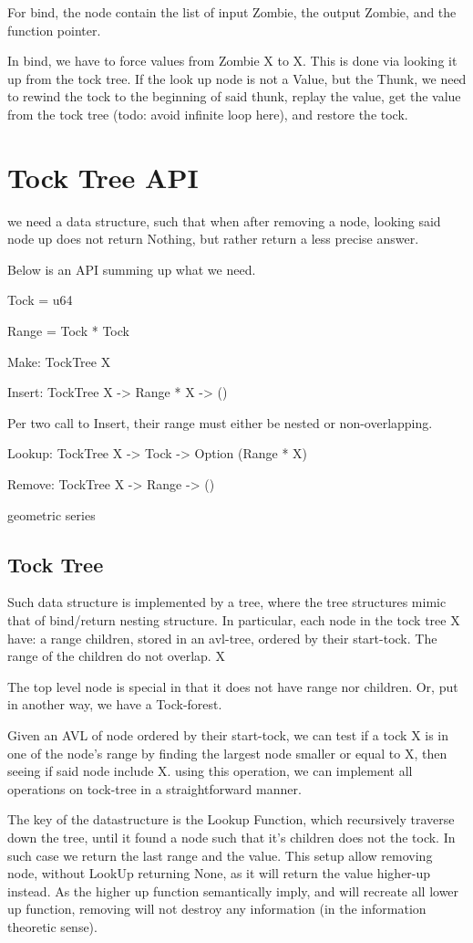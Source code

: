 For bind, the node contain the list of input Zombie, the output Zombie, and the function pointer.

In bind, we have to force values from Zombie X to X. This is done via looking it up from the tock tree. If the look up node is not a Value, but the Thunk, we need to rewind the tock to the beginning of said thunk, replay the value, get the value from the tock tree (todo: avoid infinite loop here), and restore the tock.

\section{Tock Tree API}
we need a data structure, such that when after removing a node, looking said node up does not return Nothing, but rather return a less precise answer.

Below is an API summing up what we need.

Tock = u64

Range = Tock * Tock

Make: TockTree X

Insert: TockTree X -> Range * X -> ()

Per two call to Insert, their range must either be nested or non-overlapping.

Lookup: TockTree X -> Tock -> Option (Range * X)

Remove: TockTree X -> Range -> ()

geometric series
\subsection{Tock Tree}
Such data structure is implemented by a tree, where the tree structures mimic that of bind/return nesting structure. In particular, each node in the tock tree X have:
a range
children, stored in an avl-tree, ordered by their start-tock. The range of the children do not overlap.
X

The top level node is special in that it does not have range nor children. Or, put in another way, we have a Tock-forest.

Given an AVL of node ordered by their start-tock, we can test if a tock X is in one of the node's range by finding the largest node smaller or equal to X, then seeing if said node include X. using this operation, we can implement all operations on tock-tree in a straightforward manner.

The key of the datastructure is the Lookup Function, which recursively traverse down the tree, until it found a node such that it's children does not the tock. In such case we return the last range and the value. This setup allow removing node, without LookUp returning None, as it will return the value higher-up instead. As the higher up function semantically imply, and will recreate all lower up function, removing will not destroy any information (in the information theoretic sense).
